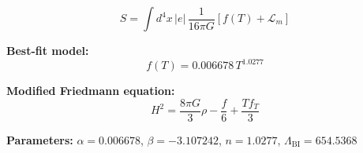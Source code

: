 
\begin{equation}
  S = \int d^4x \, |e| \, \frac{1}{16\pi G} \left[ f(T) + \mathcal{L}_m \right]
\end{equation}

\textbf{Best-fit model:}
\begin{equation}
  f(T) = 0.006678 \, T^{1.0277}
\end{equation}

\textbf{Modified Friedmann equation:}
\begin{equation}
  H^2 = \frac{8\pi G}{3} \rho - \frac{f}{6} + \frac{T f_T}{3}
\end{equation}

\textbf{Parameters:}
$\alpha = 0.006678$, \quad
$\beta = -3.107242$, \quad
$n = 1.0277$, \quad
$\Lambda_{\text{BI}} = 654.5368$